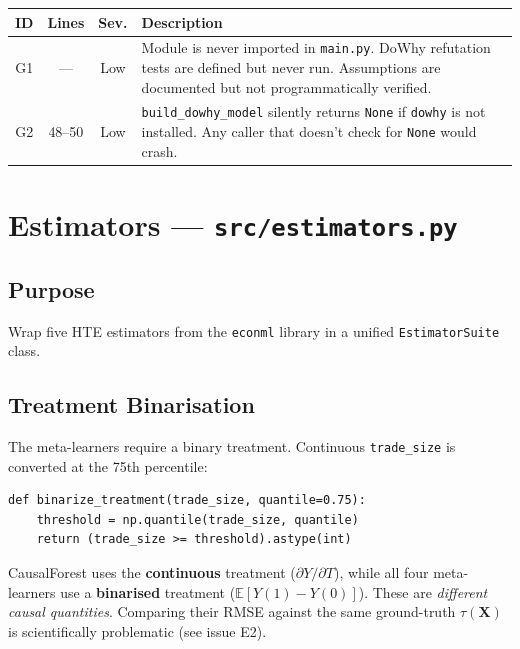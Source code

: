 \documentclass[11pt, letterpaper]{article}
\begin{document}
\begin{center}
\begin{tabularx}{\textwidth}{c c c X}
    \toprule
    \textbf{ID} & \textbf{Lines} & \textbf{Sev.} & \textbf{Description} \\
    \midrule
    G1 & --- & \textcolor{lowsev}{Low} &
        Module is never imported in \texttt{main.py}. DoWhy refutation tests are defined but never run. Assumptions are documented but not programmatically verified. \\
    G2 & 48--50 & \textcolor{lowsev}{Low} &
        \texttt{build\_dowhy\_model} silently returns \texttt{None} if \texttt{dowhy} is not installed. Any caller that doesn't check for \texttt{None} would crash. \\
    \bottomrule
\end{tabularx}
\end{center}


\newpage
\section{Estimators --- \texttt{src/estimators.py}}
\label{sec:estimators}

\subsection{Purpose}
Wrap five HTE estimators from the \texttt{econml} library in a unified \texttt{EstimatorSuite} class.

\subsection{Treatment Binarisation}

The meta-learners require a binary treatment. Continuous \texttt{trade\_size} is converted at the 75th percentile:

\begin{lstlisting}[caption={Binarise continuous treatment at a quantile threshold.}]
def binarize_treatment(trade_size, quantile=0.75):
    threshold = np.quantile(trade_size, quantile)
    return (trade_size >= threshold).astype(int)
\end{lstlisting}

\begin{medbox}
CausalForest uses the \textbf{continuous} treatment ($\partial Y / \partial T$), while all four meta-learners use a \textbf{binarised} treatment ($\mathbb{E}[Y(1) - Y(0)]$). These are \emph{different causal quantities}. Comparing their RMSE against the same ground-truth $\tau(\mathbf{X})$ is scientifically problematic (see issue E2).
\end{medbox}
\end{document}
